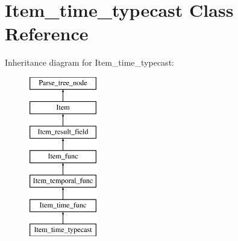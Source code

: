 \hypertarget{classItem__time__typecast}{}\section{Item\+\_\+time\+\_\+typecast Class Reference}
\label{classItem__time__typecast}
Inheritance diagram for Item\+\_\+time\+\_\+typecast\+:\begin{figure}[H]
\begin{center}
\leavevmode
\includegraphics[height=7.000000cm]{classItem__time__typecast}
\end{center}
\end{figure}
